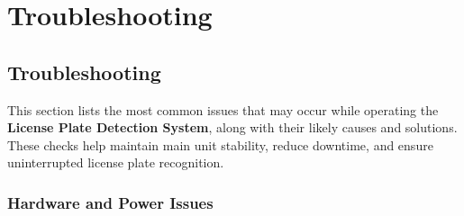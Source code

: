%
%

%
%

\chapter{Troubleshooting}

\section{Troubleshooting}

This section lists the most common issues that may occur while operating the \textbf{License Plate Detection System}, along with their likely causes and solutions.  
These checks help maintain main unit  stability, reduce downtime, and ensure uninterrupted license plate recognition.

\vspace{0.5cm}


\subsection{Hardware and Power Issues}


